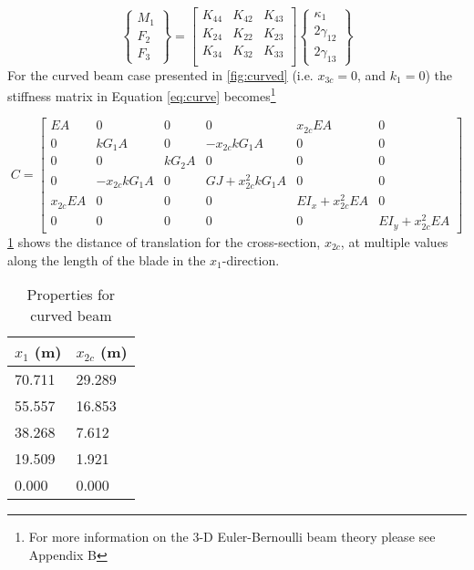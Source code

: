 \documentclass[letterpaper,12pt]{article}
\begin{document}
\begin{equation}
\begin{Bmatrix}
M_1 \\ F_2 \\ F_3
\end{Bmatrix}
 = 
\begin{bmatrix}
K_{44}  & K_{42} & K_{43} \\
K_{24} & K_{22} & K_{23} \\
K_{34} & K_{32} & K_{33} \\
\end{bmatrix} \begin{Bmatrix}
\kappa_{1} \\ 2\gamma_{12} \\ 2\gamma_{13}
\end{Bmatrix}
\end{equation}
For the curved beam case presented in \ref{fig:curved} (i.e. $x_{3c}=0$, and $k_1=0$) the stiffness matrix in Equation \ref{eq:curve} becomes\footnote{For more information on the 3-D Euler-Bernoulli beam theory please see Appendix B}

\begin{equation*}
C=\begin{bmatrix}
	EA       & 0          & 0   & 0              & x_{2c}EA        & 0               \\
	0        & kG_1A        & 0   & -x_{2c}kG_1A     & 0               & 0               \\
	0        & 0          & kG_2A & 0              & 0               & 0               \\
	0        & -x_{2c}kG_1A & 0   & GJ+x_{2c}^2kG_1A & 0               & 0               \\
	x_{2c}EA & 0          & 0   & 0              & EI_x+x_{2c}^2EA & 0               \\
	0        & 0          & 0   & 0              & 0               & EI_y+x_{2c}^2EA
\end{bmatrix}
\end{equation*}
\ref{tab:curve2} shows the distance of translation for the cross-section, $x_{2c}$, at multiple values along the length of the blade in the $x_1$-direction. 
\begin{table}
\caption{\label{tab:curve2} Properties for curved beam}
\begin{center}
    \begin{tabular}{| l | l |}
    	\hline
    	$x_1$ (m)               & $x_{2c}$ (m)             \\ \hline
    	70.711                      & 29.289   \\ \hline
    	55.557                      & 16.853                \\ \hline
    	38.268                  & 7.612               \\ \hline
    	19.509                      & 1.921                 \\ \hline
    	0.000  & 0.000 \\ \hline
    	
    \end{tabular}
\end{center}
\end{table}
\end{document}
